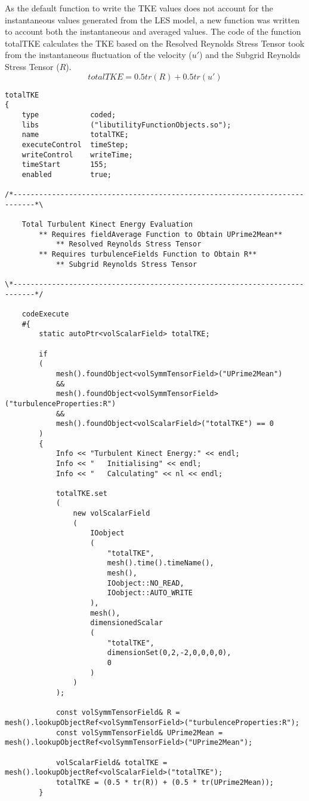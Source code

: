 As the default function to write the TKE values does not account for the instantaneous values generated from the LES model, a new function was written to account both the instantaneous and averaged values. The code of the function totalTKE calculates the TKE based on the Resolved Reynolds Stress Tensor took from the instantaneous fluctuation of the velocity ($u'$) and the Subgrid Reynolds Stress Tensor ($R$).
\begin{equation}
totalTKE= 0.5tr(R) + 0.5tr(u')
\end{equation}
\begin{lstlisting}
totalTKE
{
	type			coded;
	libs			("libutilityFunctionObjects.so");
	name			totalTKE;
	executeControl	timeStep;
	writeControl	writeTime;
	timeStart		155;
	enabled			true;

/*---------------------------------------------------------------------------*\

	Total Turbulent Kinect Energy Evaluation
		** Requires fieldAverage Function to Obtain UPrime2Mean**
			** Resolved Reynolds Stress Tensor
		** Requires turbulenceFields Function to Obtain R**
			** Subgrid Reynolds Stress Tensor

\*---------------------------------------------------------------------------*/

	codeExecute
	#{
		static autoPtr<volScalarField> totalTKE;

		if
		(
			mesh().foundObject<volSymmTensorField>("UPrime2Mean")
			&&
			mesh().foundObject<volSymmTensorField>("turbulenceProperties:R")
			&&
			mesh().foundObject<volScalarField>("totalTKE") == 0
		)
		{
			Info << "Turbulent Kinect Energy:" << endl;
			Info << "	Initialising" << endl;
			Info << "	Calculating" << nl << endl;

			totalTKE.set
			(
				new volScalarField
				(
					IOobject
					(
						"totalTKE",
						mesh().time().timeName(),
						mesh(),
						IOobject::NO_READ,
						IOobject::AUTO_WRITE
					),
					mesh(),
					dimensionedScalar
					(
						"totalTKE",
						dimensionSet(0,2,-2,0,0,0,0),
						0
					)
				)
			);

			const volSymmTensorField& R = mesh().lookupObjectRef<volSymmTensorField>("turbulenceProperties:R");
			const volSymmTensorField& UPrime2Mean = mesh().lookupObjectRef<volSymmTensorField>("UPrime2Mean");

			volScalarField& totalTKE = mesh().lookupObjectRef<volScalarField>("totalTKE");
			totalTKE = (0.5 * tr(R)) + (0.5 * tr(UPrime2Mean));
		}


\end{lstlisting}
